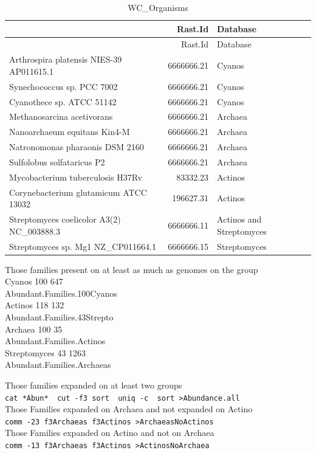 \documentclass[12pt,twoside]{reedthesis}
\begin{document}
  \begin{longtable}[]{@{}lrl@{}}
  \caption{WC\_Organisms \label{tab:WC_Organisms}}\tabularnewline
  \toprule
  & Rast.Id & Database\tabularnewline
  \midrule
  \endfirsthead
  \toprule
  & Rast.Id & Database\tabularnewline
  \midrule
  \endhead
  Arthrospira platensis NIES-39 AP011615.1 & 6666666.21 &
  Cyanos\tabularnewline
  Synechococcus sp. PCC 7002 & 6666666.21 & Cyanos\tabularnewline
  Cyanothece sp. ATCC 51142 & 6666666.21 & Cyanos\tabularnewline
  Methanosarcina acetivorans & 6666666.21 & Archaea\tabularnewline
  Nanoarchaeum equitans Kin4-M & 6666666.21 & Archaea\tabularnewline
  Natronomonas pharaonis DSM 2160 & 6666666.21 & Archaea\tabularnewline
  Sulfolobus solfataricus P2 & 6666666.21 & Archaea\tabularnewline
  Mycobacterium tuberculosis H37Rv & 83332.23 & Actinos\tabularnewline
  Corynebacterium glutamicum ATCC 13032 & 196627.31 &
  Actinos\tabularnewline
  Streptomyces coelicolor A3(2) NC\_003888.3 & 6666666.11 & Actinos and
  Streptomyces\tabularnewline
  Streptomyces sp. Mg1 NZ\_CP011664.1 & 6666666.15 &
  Streptomyces\tabularnewline
  \bottomrule
  \end{longtable}
  
  Those families present on at least as much as genomes on the group\\
  Cyanos 100 647\\
  Abundant.Families.100Cyanos\\
  Actinos 118 132\\
  Abundant.Families.43Strepto\\
  Archaea 100 35\\
  Abundant.Families.Actinos\\
  Streptomyces 43 1263\\
  Abundant.Families.Archaeas
  
  Those families expanded on at least two groups\\
  \texttt{cat\ *Abun*\ \textbar{}\ cut\ -f3\textbar{}\ sort\ \textbar{}\ uniq\ -c\ \textbar{}\ sort\ \textgreater{}Abundance.all}\\
  
  Those Families expanded on Archaea and not expanded on Actino\\
  \texttt{comm\ -23\ f3Archaeas\ f3Actinos\ \textgreater{}ArchaeasNoActinos}\\
  Those Families expanded on Actino and not on Archaea\\
  \texttt{comm\ -13\ f3Archaeas\ f3Actinos\ \textgreater{}ActinosNoArchaea}
  
\end{document}
